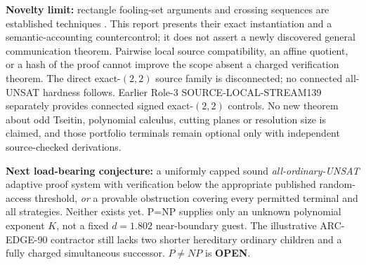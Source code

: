 \documentclass[11pt]{article}
\begin{document}
\textbf{Novelty limit:} rectangle fooling-set arguments and crossing sequences are established techniques \cite{KarchmerKushilevitzNisan1995,Katz2007,Hennie1965}. This report presents their exact instantiation and a semantic-accounting countercontrol; it does not assert a newly discovered general communication theorem. Pairwise local source compatibility, an affine quotient, or a hash of the proof cannot improve the scope absent a charged verification theorem. The direct exact-$(2,2)$ source family is disconnected; no connected all-UNSAT hardness follows. Earlier Role-3 SOURCE-LOCAL-STREAM139 separately provides connected signed exact-$(2,2)$ controls. No new theorem about odd Tseitin, polynomial calculus, cutting planes or resolution size is claimed, and those portfolio terminals remain optional only with independent source-checked derivations.

\textbf{Next load-bearing conjecture:} a uniformly capped sound \emph{all-ordinary-UNSAT} adaptive proof system with verification below the appropriate published random-access threshold, \emph{or} a provable obstruction covering every permitted terminal and all strategies. Neither exists yet. P=NP supplies only an unknown polynomial exponent $K$, not a fixed $d=1.802$ near-boundary guest. The illustrative ARC-EDGE-90 contractor still lacks two shorter hereditary ordinary children and a fully charged simultaneous successor. $P\ne NP$ is \textbf{OPEN}.



\end{document}
